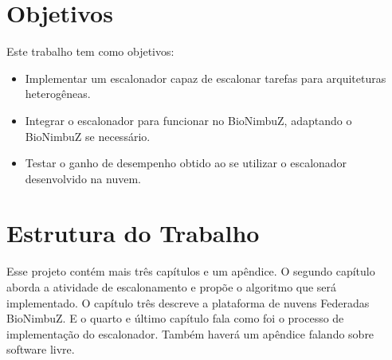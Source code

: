 \section{Objetivos}
Este trabalho tem como objetivos: 

\begin{itemize}
	\item Implementar um escalonador capaz de escalonar tarefas para arquiteturas heterogêneas.
	\item Integrar o escalonador para funcionar no BioNimbuZ, adaptando o BioNimbuZ se necessário.
	\item Testar o ganho de desempenho obtido ao se utilizar o escalonador desenvolvido na nuvem.
\end{itemize}

\section{Estrutura do Trabalho}
Esse projeto contém mais três capítulos e um apêndice. O segundo capítulo aborda a atividade de escalonamento e propõe o algoritmo que será implementado. O capítulo três descreve a plataforma de nuvens Federadas BioNimbuZ. E o quarto e último capítulo fala como foi o processo de implementação do escalonador. Também haverá um apêndice falando sobre software livre.